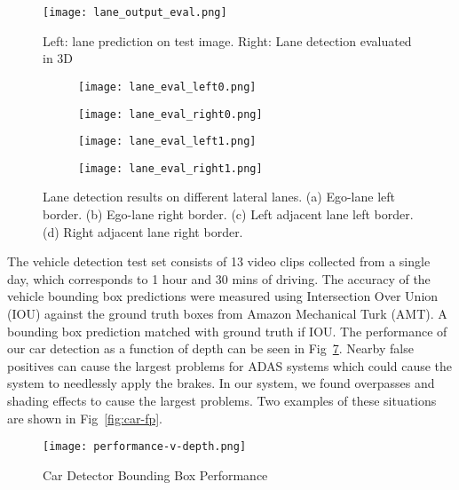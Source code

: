 \documentclass[journal]{IEEEtran}
\begin{document}
\begin{figure}[tb]
  \centering
    \texttt{[image: lane\_output\_eval.png]}
 \caption{Left: lane prediction on test image. Right: Lane detection evaluated in 3D}
 \label{fig:lane-output-eval}
\end{figure}

\begin{figure}[tb]
  \centering
    \begin{subfigure}[b]{1.6in}
      \texttt{[image: lane\_eval\_left0.png]}
      \caption{}
      \label{fig:lane-eval-left0}
    \end{subfigure}\begin{subfigure}[b]{1.6in}
      \texttt{[image: lane\_eval\_right0.png]}
      \caption{}
      \label{fig:lane-eval-right0}
    \end{subfigure}

    \begin{subfigure}[b]{1.6in}\texttt{[image: lane\_eval\_left1.png]}
      \caption{}
      \label{fig:lane-eval-left1}
    \end{subfigure}\begin{subfigure}[b]{1.6in}\texttt{[image: lane\_eval\_right1.png]}
      \caption{}
      \label{fig:lane-eval-right1}
    \end{subfigure}\caption{Lane detection results on different lateral lanes. (a) Ego-lane left border. (b) Ego-lane right border. (c) Left adjacent lane left border. (d) Right adjacent lane right border.}
 \label{fig:lane-eval-plot}
\end{figure}

The vehicle detection test set consists of 13 video clips collected from a single day, which corresponds to 1 hour and 30 mins of driving. The accuracy of the vehicle bounding box predictions were measured using Intersection Over Union (IOU) against the ground truth boxes from Amazon Mechanical Turk (AMT). A bounding box prediction matched with ground truth if IOU. The performance of our car detection as a function of depth can be seen in Fig~\ref{fig:car-bb-error}. Nearby false positives can cause the largest problems for ADAS systems which could cause the system to needlessly apply the brakes. In our system, we found overpasses and shading effects to cause the largest problems. Two examples of these situations are shown in Fig~\ref{fig:car-fp}.

\begin{figure}[tb]
  \centering
\texttt{[image: performance-v-depth.png]}
 \caption{Car Detector Bounding Box Performance}
 \label{fig:car-bb-error}
\end{figure}
\end{document}
